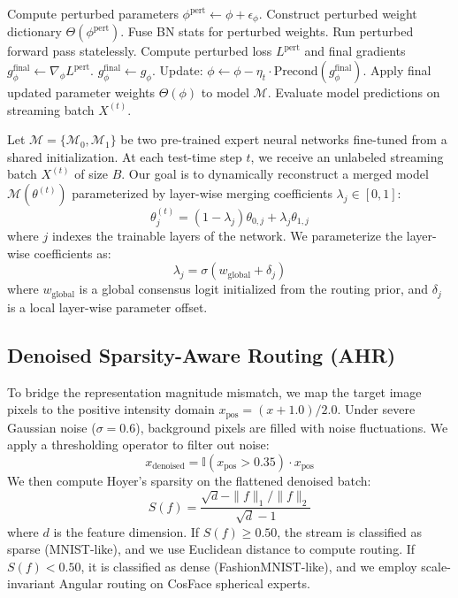 \documentclass{article}
\theoremstyle{plain}
\theoremstyle{definition}
\theoremstyle{remark}
\begin{document}
\begin{algorithm}[!ht]
\begin{algorithmic}[1]
            \STATE Compute perturbed parameters $\phi^{\text{pert}} \leftarrow \phi + \epsilon_{\phi}$.
            \STATE Construct perturbed weight dictionary $\Theta(\phi^{\text{pert}})$.
            \STATE Fuse BN stats for perturbed weights.
            \STATE Run perturbed forward pass statelessly.
            \STATE Compute perturbed loss $L^{\text{pert}}$ and final gradients $g_{\phi}^{\text{final}} \leftarrow \nabla_{\phi} L^{\text{pert}}$.
        \ELSE
            \STATE $g_{\phi}^{\text{final}} \leftarrow g_{\phi}$.
        \ENDIF
        \STATE Update: $\phi \leftarrow \phi - \eta_t \cdot \text{Precond}(g_{\phi}^{\text{final}})$.
    \ENDFOR
    \STATE Apply final updated parameter weights $\Theta(\phi)$ to model $\mathcal{M}$.
    \STATE Evaluate model predictions on streaming batch $X^{(t)}$.
\ENDFOR
\end{algorithmic}
\end{algorithm}

Let $\mathcal{M} = \{\mathcal{M}_0, \mathcal{M}_1\}$ be two pre-trained expert neural networks fine-tuned from a shared initialization. At each test-time step $t$, we receive an unlabeled streaming batch $X^{(t)}$ of size $B$. Our goal is to dynamically reconstruct a merged model $\mathcal{M}(\theta^{(t)})$ parameterized by layer-wise merging coefficients $\lambda_j \in [0, 1]$:
\begin{equation}
    \theta_j^{(t)} = (1 - \lambda_j)\theta_{0, j} + \lambda_j\theta_{1, j}
\end{equation}
where $j$ indexes the trainable layers of the network. We parameterize the layer-wise coefficients as:
\begin{equation}
    \lambda_j = \sigma(w_{\text{global}} + \delta_j)
\end{equation}
where $w_{\text{global}}$ is a global consensus logit initialized from the routing prior, and $\delta_j$ is a local layer-wise parameter offset.

\subsection{Denoised Sparsity-Aware Routing (AHR)}
To bridge the representation magnitude mismatch, we map the target image pixels to the positive intensity domain $x_{\text{pos}} = (x + 1.0)/2.0$. Under severe Gaussian noise ($\sigma = 0.6$), background pixels are filled with noise fluctuations. We apply a thresholding operator to filter out noise:
\begin{equation}
    x_{\text{denoised}} = \mathbb{I}(x_{\text{pos}} > 0.35) \cdot x_{\text{pos}}
\end{equation}
We then compute Hoyer's sparsity \cite{hoyer2004non} on the flattened denoised batch:
\begin{equation}\label{eq:hoyer_sparsity}
    S(f) = \frac{\sqrt{d} - \|f\|_1 / \|f\|_2}{\sqrt{d} - 1}
\end{equation}
where $d$ is the feature dimension. If $S(f) \geq 0.50$, the stream is classified as sparse (MNIST-like), and we use Euclidean distance to compute routing. If $S(f) < 0.50$, it is classified as dense (FashionMNIST-like), and we employ scale-invariant Angular routing on CosFace spherical experts.
\end{document}
